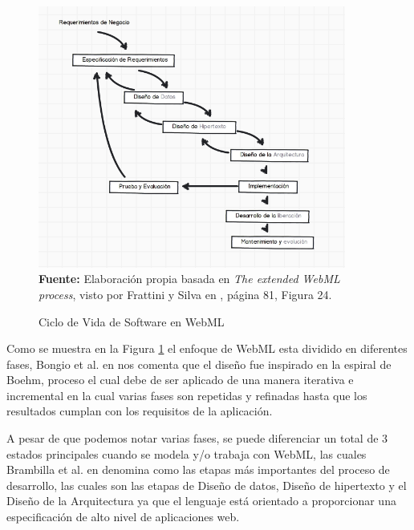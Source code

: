 \documentclass[oneside,12pt,a4paper]{memoir}%
\begin{document}
	\begin{figure}[here]
    	\centering
    	\caption{Ciclo de Vida de Software en WebML}
    	\includegraphics[width=0.9\textwidth]{figure/fig_WebMLLifeCicle.PNG}
		\newline
			\textbf{Fuente:} Elaboraci\'on propia basada en \textit{The extended WebML
			process}, visto por Frattini y Silva en \cite{Frattini2007}, p\'agina 81,
			Figura 24.
		\label{fig:WebML_LifeCicle}
    \end{figure}
	
	Como se muestra en la Figura \ref{fig:WebML_LifeCicle} el enfoque de \ac{WebML}
	esta dividido en diferentes fases, Bongio et al. en \cite{Ceri2003} nos comenta
	que el dise\~no fue inspirado en la espiral de Boehm, proceso el cual debe de ser aplicado de
	una manera iterativa e incremental en la cual varias fases son repetidas y
	refinadas hasta que los resultados cumplan con los requisitos de la aplicaci\'on.
	
	A pesar de que podemos notar varias fases, se puede diferenciar
	un total de $3$ estados principales cuando se modela y/o trabaja con
	\ac{WebML}, las cuales Brambilla et al. en \cite{Brambilla2010} denomina como
	las etapas m\'as importantes del proceso de desarrollo, las cuales son las
	etapas de Dise\~no de datos, Dise\~no de hipertexto y el Dise\~no de la
	Arquitectura ya que el lenguaje est\'a orientado a proporcionar una
	especificaci\'on de alto nivel de aplicaciones web.\\\newline
	
\end{document}
